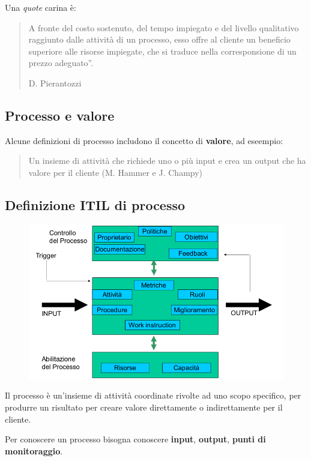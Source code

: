 Una \textit{quote} carina è:
\begin{quote}
  A fronte del costo sostenuto, del tempo impiegato e del livello qualitativo raggiunto dalle attività di un processo, esso offre al cliente un beneficio superiore alle risorse impiegate, che si traduce nella corresponsione di un prezzo adeguato”.

  D. Pierantozzi
\end{quote}

\subsection{Processo e valore}

Alcune definizioni di processo includono il concetto di \textbf{valore}, ad eseempio:
\begin{quote}
  Un insieme di attività che richiede uno o più input e crea un output che ha valore per il cliente
  (M. Hammer e J. Champy) 
\end{quote}


\subsection{Definizione ITIL di processo}

\begin{figure}[!ht]
  \centering
  \label{fig:cara_fond_proc}
  \includegraphics[scale=0.3]{images/caratteristiche_fondamentali_processo.png}
\end{figure}
Il processo è un'insieme di attività coordinate rivolte ad uno scopo specifico, per
produrre un risultato per creare valore direttamente o indirettamente per il cliente.


Per conoscere un processo bisogna conoscere \textbf{input}, \textbf{output}, \textbf{punti di monitoraggio}.


